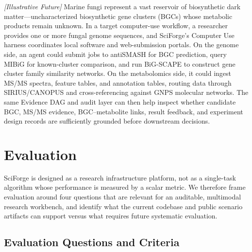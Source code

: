 \documentclass[sn-basic,Numbered,pdflatex]{sn-jnl}
\begin{document}
\textit{[Illustrative Future]} Marine fungi represent a vast reservoir of biosynthetic dark matter---uncharacterized biosynthetic gene clusters (BGCs) whose metabolic products remain unknown. In a target computer-use workflow, a researcher provides one or more fungal genome sequences, and SciForge's Computer Use harness coordinates local software and web-submission portals. On the genome side, an agent could submit jobs to antiSMASH for BGC prediction, query MIBiG for known-cluster comparison, and run BiG-SCAPE to construct gene cluster family similarity networks. On the metabolomics side, it could ingest MS/MS spectra, feature tables, and annotation tables, routing data through SIRIUS/CANOPUS and cross-referencing against GNPS molecular networks. The same Evidence DAG and audit layer can then help inspect whether candidate BGC, MS/MS evidence, BGC--metabolite links, result feedback, and experiment design records are sufficiently grounded before downstream decisions.

\section{Evaluation}

SciForge is designed as a research infrastructure platform, not as a single-task algorithm whose performance is measured by a scalar metric. We therefore frame evaluation around four questions that are relevant for an auditable, multimodal research workbench, and identify what the current codebase and public scenario artifacts can support versus what requires future systematic evaluation.

\subsection{Evaluation Questions and Criteria}
\end{document}
